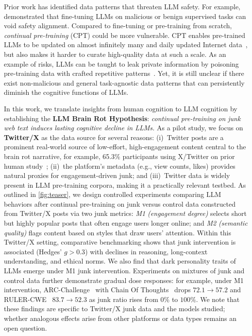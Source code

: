 Prior work has identified data patterns that threaten LLM safety.
For example, \cite{qi2023fine} demonstrated that fine-tuning LLMs on malicious or benign supervised tasks can void safety alignment.
Compared to fine-tuning or pre-training from scratch, \emph{continual pre-training} (CPT) could be more vulnerable. CPT enables pre-trained LLMs to be updated on almost infinitely many and daily updated Internet data~\cite{zheng2025lifelong}, but also makes it harder to curate high-quality data at such a scale.
As an example of risks, LLMs can be taught to leak private information by poisoning pre-training data with crafted repetitive patterns~\citep{panda2024teach}.
Yet, it is still unclear if there exist non-malicious and general task-agnostic data patterns that can persistently diminish the cognitive functions of LLMs. 

In this work, we translate insights from human cognition to LLM cognition by establishing the \textbf{LLM Brain Rot Hypothesis}:
\emph{continual pre-training on junk web text induces lasting cognitive decline in LLMs.}
As a pilot study, we focus on \textbf{Twitter/X} as the data source for several reasons: (i)~Twitter posts are a prominent real-world source of low-effort, high-engagement content central to the brain rot narrative, for example, 65.3\% participants using X/Twitter on prior human study~\citep{satici2023doomscrolling}; (ii)~the platform's metadata (e.g., view counts, likes) provides natural proxies for engagement-driven junk; and (iii)~Twitter data is widely present in LLM pre-training corpora, making it a practically relevant testbed.
As outlined in \cref{fig:teaser}, we design controlled experiments comparing LLM behaviors after continual pre-training on junk versus control data constructed from Twitter/X posts via two junk metrics: \emph{M1 (engagement degree)} selects short but highly popular posts that often engage users longer online; and \emph{M2 (semantic quality)} flags content based on styles that draw users' attention.
Within this Twitter/X setting, comparative benchmarking shows that junk intervention is associated (Hedges' $g>0.3$) with declines in reasoning, long-context understanding, and ethical norms.
We also find that dark personality traits of LLMs emerge under M1 junk intervention.
Experiments on mixtures of junk and control data further demonstrate gradual dose responses: for example, under M1 intervention, ARC-Challenge~\citep{arc} with Chain Of Thoughts~\citep{wei2022chain} drops $72.1 \rightarrow 57.2$ and RULER-CWE~\citep{ruler} $83.7 \rightarrow 52.3$ as junk ratio rises from $0\%$ to $100\%$.
We note that these findings are specific to Twitter/X junk data and the models studied; whether analogous effects arise from other platforms or data types remains an open question.

